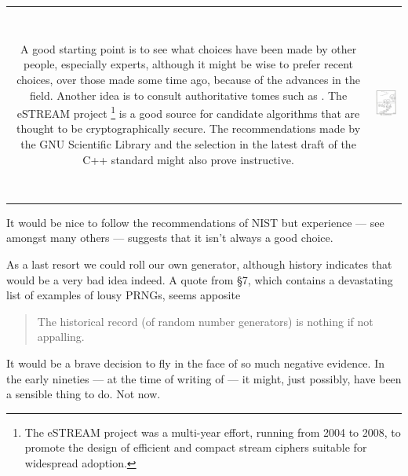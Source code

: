 \documentclass[letterpaper,12pt]{article}
\begin{document}
\noindent
\begin{tabular*}{7in}{cc}
\begin{minipage}{3.4in}
A good starting point is to see what choices have been made by other
people, especially experts, although it might be wise to prefer recent
choices, over those made some time ago, because of the advances in the
field.  Another idea is to consult authoritative tomes such as
\cite{PressEtAl:numericalRecipes,Knuth:SemiNumerical3}.
The eSTREAM project%
\footnote{
The eSTREAM project\cite{eStream} was a multi-year effort, running from
2004 to 2008, to promote the design of efficient and compact stream ciphers
suitable for widespread adoption.
}
is a good source for candidate algorithms that are thought to be
cryptographically secure. The recommendations made by the GNU Scientific
Library \cite{GnuScientificLibrary} and the selection in the latest draft
of the C++ standard\cite{CplusplusStd:N4820} might also prove instructive.

\end{minipage}
&
\parbox{2.5in}{
  \includegraphics[width=2.5in,height=2.5in]{larson.jpg}
}
\end{tabular*}

It would be nice to follow the recommendations of NIST but experience ---
see \cite{Schneier:BackDoor} amongst many others --- suggests that it isn't
always a good choice.

\vspace{0.1in}

As a last resort we could roll our own generator, although history
indicates that would be a very bad idea indeed.  A quote from
\cite{PressEtAl:numericalRecipes-2} \S 7, which contains a devastating list
of examples of lousy PRNGs, seems apposite
\begin{quote}
  The historical record (of random number generators) is nothing if not
  appalling.
\end{quote}
It would be a brave decision to fly in the face of so much negative
evidence. In the early nineties --- at the time of writing of
\cite{PressEtAl:numericalRecipes-2} --- it might, just possibly, have been
a sensible thing to do. Not now.
\end{document}
